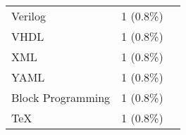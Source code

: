\begin{table}[ht]
\begin{tabular}{l c p{4cm}}
		Verilog & 1 (0.8\%) & \cite{kruger2024performance} \\
		VHDL & 1 (0.8\%) & \cite{kruger2024performance} \\
		XML & 1 (0.8\%) & \cite{kruger2024performance} \\
		YAML & 1 (0.8\%) & \cite{kruger2024performance} \\
		Block Programming & 1 (0.8\%) & \cite{kazemitabaar2024novices} \\
		TeX & 1 (0.8\%) & \cite{feng2024more} \\
	\bottomrule
    \end{tabular}
    \label{tab:languages}
\end{table}